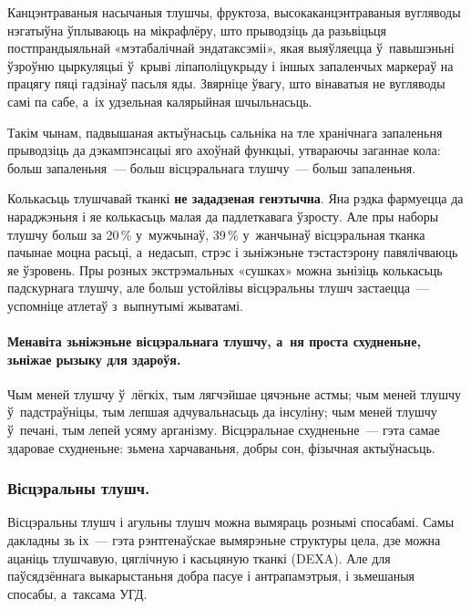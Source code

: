 
Канцэнтраваныя насычаныя тлушчы, фруктоза, высокаканцэнтраваныя вугляводы нэгатыўна ўплываюць на мікрафлёру, што прыводзіць да разьвіцьця постпрандыяльнай «мэтабалічнай эндатаксэміі», якая выяўляецца ў~павышэньні ўзроўню цыркуляцыі ў~крыві ліпаполіцукрыду і іншых запаленчых маркераў на працягу пяці гадзінаў пасьля яды. Звярніце ўвагу, што вінаватыя не вугляводы самі па сабе, а~іх удзельная калярыйная шчыльнасьць.

Такім чынам, падвышаная актыўнасьць сальніка на тле хранічнага запаленьня прыводзіць да дэкампэнсацыі яго ахоўнай функцыі, утвараючы заганнае кола: больш запаленьня~--- больш вісцэральнага тлушчу~--- больш запаленьня.

Колькасьць тлушчавай тканкі \textbf{не зададзеная генэтычна}. Яна рэдка фармуецца да нараджэньня і яе колькасьць малая да падлеткавага ўзросту. Але пры наборы тлушчу больш за 20\,\% у~мужчынаў, 39\,\% у~жанчынаў вісцэральная тканка пачынае моцна расьці, а~недасып, стрэс і зьніжэньне тэстастэрону павялічваюць яе ўзровень. Пры розных экстрэмальных «сушках» можна зьнізіць колькасьць падскурнага тлушчу, але больш устойлівы вісцэральны тлушч застаецца~--- успомніце атлетаў з~выпнутымі жыватамі.

\paragraph{Менавіта зьніжэньне вісцэральнага тлушчу, а~ня проста схудненьне, зьніжае рызыку для здароўя.} Чым меней тлушчу ў~лёгкіх, тым лягчэйшае цячэньне астмы; чым меней тлушчу ў~падстраўніцы, тым лепшая адчувальнасьць да інсуліну; чым меней тлушчу ў~печані, тым лепей усяму арганізму. Вісцэральнае схудненьне~--- гэта самае здаровае схудненьне: зьмена харчаваньня, добры сон, фізычная актыўнасьць.

\subsubsection{Вісцэральны тлушч.}
Вісцэральны тлушч і агульны тлушч можна вымяраць рознымі спосабамі. Самы дакладны зь іх~--- гэта рэнтгенаўскае вымярэньне структуры цела, дзе можна ацаніць тлушчавую, цяглічную і касьцяную тканкі (DEXA). Але для паўсядзённага выкарыстаньня добра пасуе і антрапамэтрыя, і зьмешаныя спосабы, а~таксама УГД.

